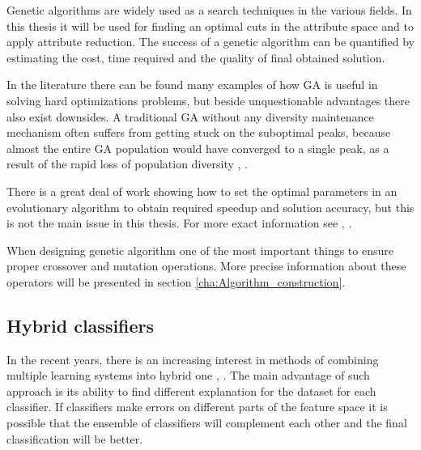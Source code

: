 Genetic algorithms are widely used as a search techniques in the various fields. 
In this thesis it will be used for finding an optimal cuts in the attribute space and to 
apply attribute reduction. The success of a genetic algorithm can be quantified by estimating 
the cost, time required and the quality of final obtained solution. 

In the literature there can be found many examples of how GA is useful in solving hard 
optimizations problems, but beside unquestionable advantages there also exist downsides. 
A traditional GA without any diversity maintenance mechanism often suffers from getting 
stuck on the suboptimal peaks, because almost the entire GA population would have converged 
to a single peak, as a result of the rapid loss of population diversity \cite{bib44}, \cite{bib45}. 

There is a great deal of work showing how to set the optimal parameters in an evolutionary 
algorithm to obtain required speedup and solution accuracy, but this is not the main issue 
in this thesis. For more exact information see \cite{bib42}, \cite{bib43}.

When designing genetic algorithm one of the most important things to ensure proper crossover 
and mutation operations. More precise information about these operators will be
presented in section \ref{cha:Algorithm_construction}.

\subsection{Hybrid classifiers} 
\label{cha:Hybrid_classifiers}
In the recent years, there is an increasing interest in methods of combining
multiple learning systems into hybrid one \cite{bib5}, \cite{bib6}. The main advantage of such approach
is its ability to find different explanation for the dataset for each
classifier. If classifiers make errors on different parts of the feature space
it is possible that the ensemble of classifiers will complement each other and
the final classification will be better. 

